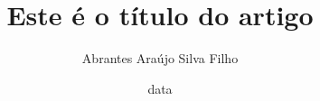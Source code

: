 \documentclass[12pt, twoside]{article}
\begin{document}
\title{Este é o título do artigo}
\author{Abrantes Araújo Silva Filho}
\date{data}
\maketitle
\tableofcontents



%

%

\end{document}
